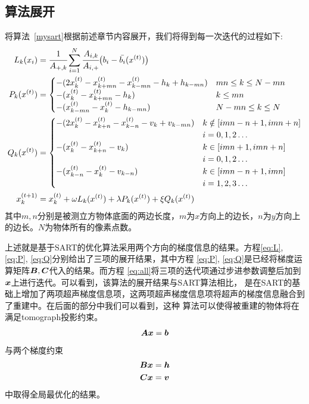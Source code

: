 \subsection{算法展开}\label{sec:algodetail}
将算法~\ref{mysart}根据前述章节内容展开，我们将得到每一次迭代的过程如下:
\begin{align}
 L_k(x_i) &= \cfrac{1}{A_{+,k}}\sum^N_{i=1}\cfrac{A_{i,k}}{A_{i,+}}\bigl(b_i-\bar{b_i}(x^{(t)})\bigr) \label{eq:L} \\
P_k(x^{(t)}) &= \begin{cases}
                            -(2x_k^{(t)} - x_{k+mn}^{(t)} - x_{k-mn}^{(t)} - h_k + h_{k-mn}) & mn \le k \le N-mn \\
                            -(x_k^{(t)} - x_{k+mn}^{(t)} - h_k) &  k\le mn \\
                            -(x_{k-mn}^{(t)} - x_{k}^{(t)} - h_{k-mn}) &  N-mn \le k \le N
                        \end{cases}  \label{eq:P} \\
Q_k(x^{(t)}) &= \begin{cases}
                            -(2x_k^{(t)} - x_{k+n}^{(t)} - x_{k-n}^{(t)} - v_k + v_{k-mn}) & k \notin [ imn-n+1, imn+n]
                            \\ &i = 0,1,2\hdots\\
                            -(x_k^{(t)} - x_{k+n}^{(t)} - v_k) & k \in \left[imn+1,imn+n\right] \\ &i = 0,1,2\hdots\\
                            -(x_{k-n}^{(t)} - x_{k}^{(t)} - v_{k-n}) &  k \in [imn-n+1,imn] \\ &i= 1,2,3 \hdots
                        \end{cases} \label{eq:Q} \\
x_k^{(t+1)}&= x_k^{(t)} + \omega L_k(x^{(t)}) + \lambda P_k(x^{(t)}) + \xi Q_k(x^{(t)}) \label{eq:all}
\end{align}
其中$m,n$分别是被测立方物体底面的两边长度，$m$为$x$方向上的边长，$n$为$y$方向上的边长。$N$为物体所有的像素点数。

上述就是基于SART的优化算法采用两个方向的梯度信息的结果。方程\eqref{eq:L}, \eqref{eq:P}, \eqref{eq:Q}分别给出了三项的展开结果，其中方程
\eqref{eq:P}, \eqref{eq:Q}是已经将梯度运算矩阵$\bm{B},\bm{C}$代入的结果。而方程
\eqref{eq:all}将三项的迭代项通过步进参数调整后加到$\bm{ x}$上进行迭代。可以看到，该算法的展开结果与SART算法相比，
是在SART的基础上增加了两项超声梯度信息项，这两项超声梯度信息项将超声的梯度信息融合到了重建中。在后面的部分中我们可以看到，这种
算法可以使得被重建的物体将在满足tomograph投影约束。
\begin{equation*}
\bm{A}\bm{ x} = \bm{b}
\end{equation*}
与两个梯度约束
\begin{align*}
\bm{B}\bm{ x} &= \bm{h} \\
\bm{C}\bm{ x} &= \bm{v}
\end{align*}
中取得全局最优化的结果。



